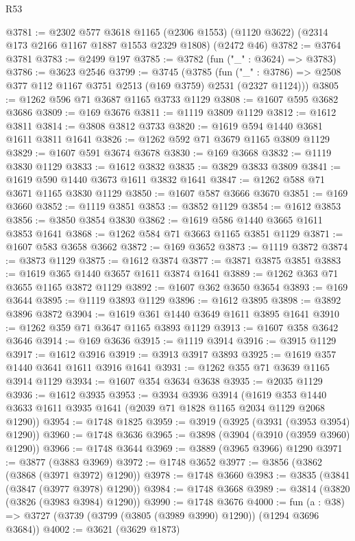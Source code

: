 \begin{lexlean}{R53}
\begin{coremodule}
@3781 := @2302
    @577
    @3618
    @1165
    (@2306 @1553)
    (@1120 @3622)
    (@2314 @173 @2166 @1167 @1887 @1553 @2329 @1808)
    (@2472 @46)
@3782 := @3764 @3781
@3783 := @2499 @197
@3785 := @3782 (fun ("_" : @3624) => @3783)
@3786 := @3623 @2546
@3799 := @3745
    (@3785
      (fun ("_" : @3786) => @2508 @377 @112 @1167 @3751 @2513 (@169 @3759) @2531 (@2327 @1124)))
@3805 := @1262 @596 @71 @3687 @1165 @3733 @1129
@3808 := @1607 @595 @3682 @3686
@3809 := @169 @3676
@3811 := @1119 @3809 @1129
@3812 := @1612 @3811
@3814 := @3808 @3812 @3733
@3820 := @1619 @594 @1440 @3681 @1611 @3811 @1641
@3826 := @1262 @592 @71 @3679 @1165 @3809 @1129
@3829 := @1607 @591 @3674 @3678
@3830 := @169 @3668
@3832 := @1119 @3830 @1129
@3833 := @1612 @3832
@3835 := @3829 @3833 @3809
@3841 := @1619 @590 @1440 @3673 @1611 @3832 @1641
@3847 := @1262 @588 @71 @3671 @1165 @3830 @1129
@3850 := @1607 @587 @3666 @3670
@3851 := @169 @3660
@3852 := @1119 @3851
@3853 := @3852 @1129
@3854 := @1612 @3853
@3856 := @3850 @3854 @3830
@3862 := @1619 @586 @1440 @3665 @1611 @3853 @1641
@3868 := @1262 @584 @71 @3663 @1165 @3851 @1129
@3871 := @1607 @583 @3658 @3662
@3872 := @169 @3652
@3873 := @1119 @3872
@3874 := @3873 @1129
@3875 := @1612 @3874
@3877 := @3871 @3875 @3851
@3883 := @1619 @365 @1440 @3657 @1611 @3874 @1641
@3889 := @1262 @363 @71 @3655 @1165 @3872 @1129
@3892 := @1607 @362 @3650 @3654
@3893 := @169 @3644
@3895 := @1119 @3893 @1129
@3896 := @1612 @3895
@3898 := @3892 @3896 @3872
@3904 := @1619 @361 @1440 @3649 @1611 @3895 @1641
@3910 := @1262 @359 @71 @3647 @1165 @3893 @1129
@3913 := @1607 @358 @3642 @3646
@3914 := @169 @3636
@3915 := @1119 @3914
@3916 := @3915 @1129
@3917 := @1612 @3916
@3919 := @3913 @3917 @3893
@3925 := @1619 @357 @1440 @3641 @1611 @3916 @1641
@3931 := @1262 @355 @71 @3639 @1165 @3914 @1129
@3934 := @1607 @354 @3634 @3638
@3935 := @2035 @1129
@3936 := @1612 @3935
@3953 := @3934
    @3936
    @3914
    (@1619 @353 @1440 @3633 @1611 @3935 @1641 (@2039 @71 @1828 @1165 @2034 @1129 @2068 @1290))
@3954 := @1748 @1825
@3959 := @3919 (@3925 (@3931 (@3953 @3954) @1290))
@3960 := @1748 @3636
@3965 := @3898 (@3904 (@3910 (@3959 @3960) @1290))
@3966 := @1748 @3644
@3969 := @3889 (@3965 @3966) @1290
@3971 := @3877 (@3883 @3969)
@3972 := @1748 @3652
@3977 := @3856 (@3862 (@3868 (@3971 @3972) @1290))
@3978 := @1748 @3660
@3983 := @3835 (@3841 (@3847 (@3977 @3978) @1290))
@3984 := @1748 @3668
@3989 := @3814 (@3820 (@3826 (@3983 @3984) @1290))
@3990 := @1748 @3676
@4000 := fun (a : @38) => @3727 (@3739 (@3799 (@3805 (@3989 @3990) @1290)) (@1294 @3696 @3684))
@4002 := @3621 (@3629 @1873)

\end{coremodule}
\end{lexlean}
